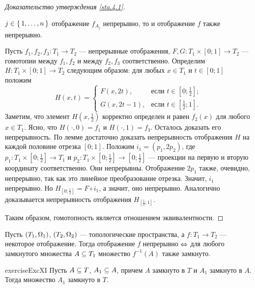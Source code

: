 \documentclass[main]{subfiles}
\begin{document}
\begin{proof}[Доказательство утверждения \ref{sta.4.1}]
\begin{phased}
\begin{lemma}
				$ j \in \left\{\,1, \ldots, n\,\right\} $ отображение $ f_{A_j} $ непрерывно, то и отображение $ f $ также
				непрерывно.
			\end{lemma}
			Пусть $ f_1, f_2, f_3 \colon T_1 \to T_2 $ --- непрерывные отображения,
			$ F, G \colon T_1 \times [0; 1] \to T_2 $ --- гомотопии между $ f_1, f_2 $ и между $ f_2, f_3 $
			соответственно. Определим $ H \colon T_1 \times [0; 1] \to T_2 $ следующим образом: для любых
			$ x \in T_1 $ и $ t \in [0; 1] $ положим
				\[ H(x, t) = \begin{cases}
						F(x, 2 t), & \text{если } t \in \left[ 0; \frac{1}{2} \right]; \\
						G(x, 2 t - 1), & \text{если } t \in \left[\frac{1}{2}; 1 \right].
					\end{cases} \]
			Заметим, что элемент $ H \left( x, \frac{1}{2} \right) $ корректно определен и равен $ f_2(x) $ для любого
			$ x \in T_1 $. Ясно, что $ H(\cdot, 0) = f_1 $ и $ H(\cdot, 1) = f_3 $. Осталось доказать его
			непрерывность. По лемме достаточно доказать непрерывность отображения $ H $ на каждой половине отрезка
			$ [0; 1] $. Положим $ i_1 = (p_1, 2 p_2) $, где
			$ p_1 \colon T_1 \times \left[ 0; \frac{1}{2} \right] \to T_1 $ и
			$ p_2 \colon T_1 \times \left[ 0; \frac{1}{2} \right] \to \left[ 0; \frac{1}{2} \right] $ --- проекции на
			первую и вторую координату соответственно. Они непрерывны. Отображение $ 2 p_1 $ также, очевидно,
			непрерывно, так как это линейное преобразование отрезка. Значит, $ i_1 $ непрерывно. Но
			$ H_{\left[ 0; \frac{1}{2} \right]} = F \circ i_1 $, а значит, оно непрерывно.
			Аналогично доказывается непрерывность отображения $ H_{\left[ \frac{1}{2}; 1 \right]} $.
	\end{phased}
	Таким образом, гомотопность является отношением эквивалентности.
\end{proof}

\begin{proposition} \label{pro.4.1}
	Пусть $ (T_1, \Omega_1) $, $ (T_2, \Omega_2) $ --- топологические пространства, а $ f \colon T_1 \to T_2 $ --- некоторое
	отображение. Тогда отображение $ f $ непрерывно $\Leftrightarrow$ для любого замкнутого множества $ A \subseteq T_1 $ множество
	$ f^{-1}(A) $ также замкнуто.
\end{proposition}

\begin{restatable}{exercise}{ExcXI}
	Пусть $ A \subseteq T $, $ A_1 \subseteq A $, причем $ A $ замкнуто в $ T $ и $ A_1 $ замкнуто в $ A $. Тогда множество
	$ A_1 $ замкнуто в $ T $.
\end{restatable}
\end{document}
